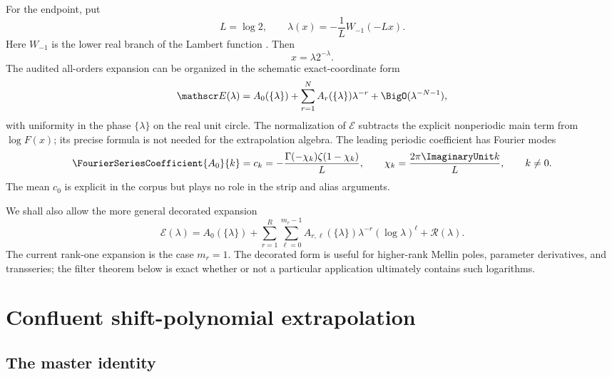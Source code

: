 \documentclass[11pt]{article}
\numberwithin{equation}{section}
\theoremstyle{definition}
\theoremstyle{remark}
\begin{document}
For the endpoint, put
\begin{equation}
 L=\log2,
 \qquad
 \lambda(x)=-\frac1L W_{-1}(-Lx).
 \label{p6:eq:lambda-def}
\end{equation}
Here $W_{-1}$ is the lower real branch of the Lambert function \cite{p6:corless1996}.
Then
\begin{equation}
 x=\lambda2^{-\lambda}.
 \label{p6:eq:exact-lambert}
\end{equation}
The audited all-orders expansion can be organized in the schematic exact-coordinate form
\begin{equation}
 \mathscr E(\lambda)
 =A_0(\{\lambda\})+\sum_{r=1}^{N}A_r(\{\lambda\})\lambda^{-r}
 +\BigO(\lambda^{-N-1}),
 \label{p6:eq:pure-endpoint-expansion}
\end{equation}
with uniformity in the phase $\{\lambda\}$ on the real unit circle.  The normalization of
$\mathscr E$ subtracts the explicit nonperiodic main term from $\log F(x)$; its precise
formula is not needed for the extrapolation algebra.  The leading periodic coefficient has
Fourier modes
\begin{equation}
 \FourierSeriesCoefficient{A_0}{k}
 =c_k=-\frac{\Gamma(-\chi_k)\zeta(1-\chi_k)}{L},
 \qquad
 \chi_k=\frac{2\pi\ImaginaryUnit k}{L},\qquad k\ne0.
 \label{p6:eq:gamma-zeta-coeff}
\end{equation}
The mean $c_0$ is explicit in the corpus but plays no role in the strip and alias arguments.

We shall also allow the more general decorated expansion
\begin{equation}
 \mathscr E(\lambda)
 =A_0(\{\lambda\})
 +\sum_{r=1}^{R}\sum_{\ell=0}^{m_r-1}
 A_{r,\ell}(\{\lambda\})\lambda^{-r}(\log\lambda)^\ell
 +\mathcal R(\lambda).
 \label{p6:eq:decorated-expansion}
\end{equation}
The current rank-one expansion is the case $m_r=1$.  The decorated form is useful for
higher-rank Mellin poles, parameter derivatives, and transseries; the filter theorem below
is exact whether or not a particular application ultimately contains such logarithms.

\section{Confluent shift-polynomial extrapolation}
\label{p6:sec:confluent}

\subsection{The master identity}
\end{document}
